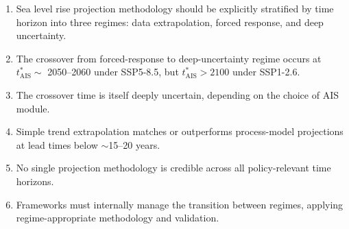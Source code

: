 \documentclass[11pt]{article}
\begin{document}
\begin{enumerate}
  \item Sea level rise projection methodology should be explicitly stratified by time horizon into three regimes: data extrapolation, forced response, and deep uncertainty.
  \item The crossover from forced-response to deep-uncertainty regime occurs at $t^*_{\text{AIS}} \sim$ 2050--2060 under SSP5-8.5, but $t^*_{\text{AIS}} > 2100$ under SSP1-2.6.
  \item The crossover time is itself deeply uncertain, depending on the choice of AIS module.
  \item Simple trend extrapolation matches or outperforms process-model projections at lead times below $\sim$15--20 years.
  \item No single projection methodology is credible across all policy-relevant time horizons.
  \item Frameworks must internally manage the transition between regimes, applying regime-appropriate methodology and validation.
\end{enumerate}




\end{document}
